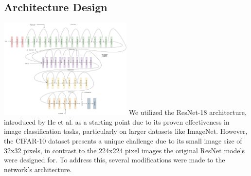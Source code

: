 \documentclass[twoside, 11pt]{article}
\begin{document}
\subsection{Architecture Design}
\includegraphics[width=0.5\textwidth]{ArchitectureDiagram.jpg}
We utilized the ResNet-18 architecture, introduced by He et al. \cite{he2016deep} as a starting point due to its proven effectiveness in image classification tasks, particularly on larger datasets like ImageNet. However, the CIFAR-10 dataset presents a unique challenge due to its small image size of 32x32 pixels, in contrast to the 224x224 pixel images the original ResNet models were designed for. To address this, several modifications were made to the network’s architecture.
\end{document}
